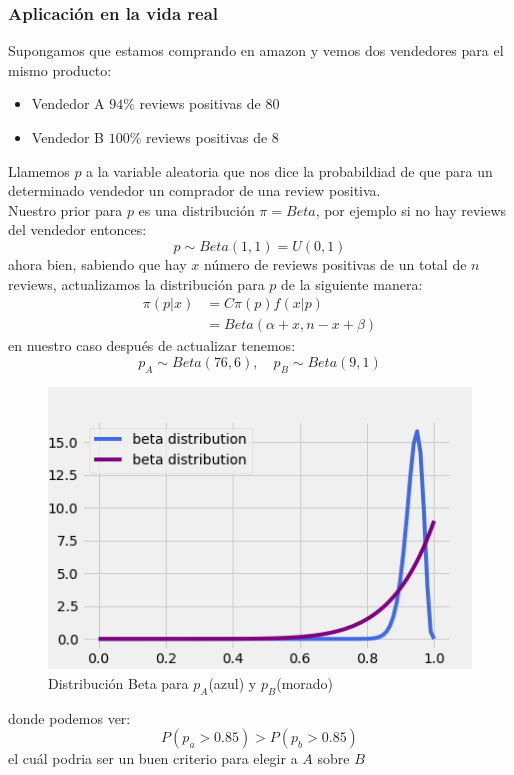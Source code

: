 \documentclass{article}
\begin{document}
\begin{tcolorbox}[breakable]
    \subsubsection*{Aplicación en la vida real}
    Supongamos que estamos comprando en amazon y vemos dos vendedores para el mismo producto:
    \begin{itemize}
        \item Vendedor A $94\%$ reviews positivas de $80$
        \item Vendedor B $100\%$ reviews positivas de $8$
    \end{itemize}
    Llamemos $p$ a la variable aleatoria que nos dice la probabildiad de que para un 
    determinado vendedor un comprador de una review positiva. \\
    Nuestro prior para $p$ es una distribución $\pi=Beta$, por ejemplo si 
    no hay reviews del vendedor entonces:
    \[ p \sim Beta(1,1) = U(0,1) \]
    ahora bien, sabiendo que hay $x$ número de reviews positivas de un total de $n$ reviews, 
    actualizamos la distribución para $p$ de la siguiente manera:
    \begin{align*}
        \pi(p|x) 
        &= C \pi(p) f(x|p) \\
        &= Beta(\alpha+x,n-x+\beta)
    \end{align*}
    en nuestro caso después de actualizar tenemos:
    \[ p_A \sim Beta(76,6), \quad p_B \sim Beta(9,1) \]
    \begin{figure}[H]
        \centering
        \includegraphics[scale=0.7]{images/p7_beta.png}
        \caption{Distribución Beta para $p_A$(azul) y $p_B$(morado)}
    \end{figure}
    donde podemos ver:
    \[ P(p_a > 0.85) > P(p_b > 0.85) \]
    el cuál podria ser un buen criterio para elegir a $A$ sobre $B$

\end{tcolorbox}
\end{document}
